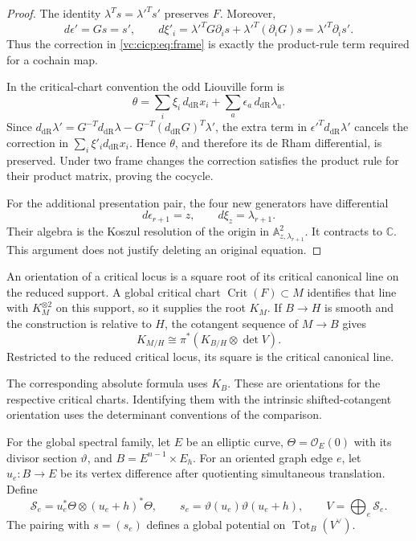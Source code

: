 \begin{proof}
The identity $\lambda^Ts=\lambda'^Ts'$ preserves $F$.
Moreover,
\[
 d\epsilon'=Gs=s',\qquad
 d\xi'_i=\lambda'^TG\partial_i s
             +\lambda'^T(\partial_iG)s
          =\lambda'^T\partial_i s'.
\]
Thus the correction in \eqref{vc:cicp:eq:frame} is exactly the
product-rule term required for a cochain map.

In the critical-chart convention the odd Liouville form is
\[
 \theta=\sum_i\xi_i\,d_{\mathrm{dR}}x_i
                +\sum_a\epsilon_a\,d_{\mathrm{dR}}\lambda_a.
\]
Since
$d_{\mathrm{dR}}\lambda'
 =G^{-T}d_{\mathrm{dR}}\lambda
  -G^{-T}(d_{\mathrm{dR}}G)^T\lambda'$, the extra term in
$\epsilon'^T d_{\mathrm{dR}}\lambda'$ cancels the correction
in $\sum_i\xi'_i d_{\mathrm{dR}}x_i$.
Hence $\theta$, and therefore its de Rham differential,
is preserved. Under two frame changes the correction satisfies
the product rule for their product matrix, proving the cocycle.

For the additional presentation pair, the four new generators
have differential
\[
 d\epsilon_{r+1}=z,\qquad d\xi_z=\lambda_{r+1}.
\]
Their algebra is the Koszul resolution of the origin in
$\mathbb A^2_{z,\lambda_{r+1}}$. It contracts to $\mathbb C$.
This argument does not justify deleting an original equation.
\end{proof}

An orientation of a critical locus is a square root of its
critical canonical line on the reduced support. A global
critical chart $\operatorname{Crit}(F)\subset M$ identifies
that line with $K_M^{\otimes2}$ on this support, so it
supplies the root $K_M$. If
$B\to H$ is smooth and the construction is relative to $H$,
the cotangent sequence of $M\to B$ gives
\begin{equation}\label{vc:cicp:eq:orientation}
 K_{M/H}\cong\pi^*(K_{B/H}\otimes\det V).
\end{equation}
Restricted to the reduced critical locus, its square is the
critical canonical line.

The corresponding absolute formula
uses $K_B$. These are orientations for the respective critical
charts. Identifying them with the intrinsic shifted-cotangent
orientation uses the determinant conventions of the comparison.

For the global spectral family, let $E$ be an elliptic curve,
$\Theta=\mathcal O_E(0)$ with its divisor section $\vartheta$,
and $B=E^{n-1}\times E_h$.
For an oriented graph edge $e$, let $u_e:B\to E$ be its
vertex difference after quotienting simultaneous translation.
Define
\[
 \mathcal S_e=u_e^*\Theta\otimes(u_e+h)^*\Theta,
 \qquad s_e=\vartheta(u_e)\vartheta(u_e+h),
 \qquad V=\bigoplus_e\mathcal S_e.
\]
The pairing with $s=(s_e)$ defines a global potential on
$\operatorname{Tot}_B(V^\vee)$.

